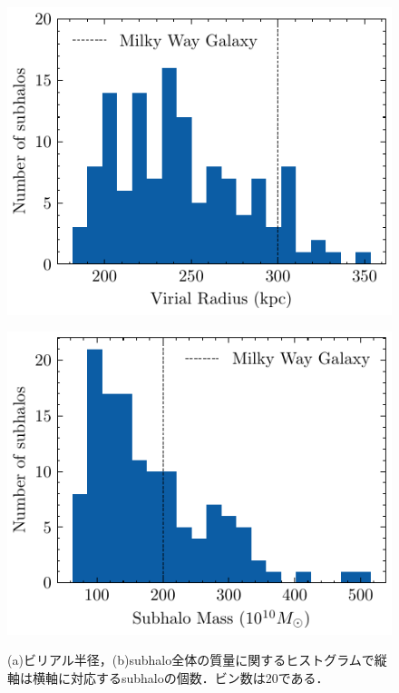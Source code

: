 \begin{figure}
	\centering
	\begin{minipage}[b]{0.45\linewidth}
		\centering
		\includegraphics[width=\linewidth]{pic/numsubhalo}
		\subcaption{}
		\label{fig:numsubhalo}
	\end{minipage}
	\begin{minipage}[b]{0.45\linewidth}
		\centering
		\includegraphics[width=\linewidth]{pic/EstimatedSubhaloMass}
		\subcaption{}
		\label{fig:estimatedsubhalomass}
	\end{minipage}
	\captionsetup{width=.8\linewidth}
	\caption{(a)ビリアル半径，(b)subhalo全体の質量に関するヒストグラムで縦軸は横軸に対応するsubhaloの個数．ビン数は20である．}
	\label{fig:distribution_of_VR_MASS}
\end{figure}

